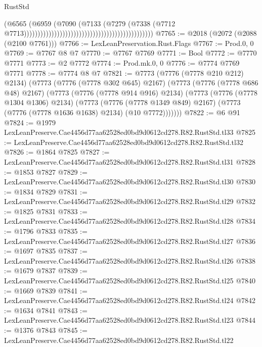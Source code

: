 \begin{lexlean}{RustStd}
\begin{coremodule}
                                                                                    (@6565
                                                                                      (@6959
                                                                                        (@7090
                                                                                          (@7133
                                                                                            (@7279
                                                                                              (@7338
                                                                                                (@7712
                                                                                                  @7713)))))))))))))))))))))))))))))))))))))))))))))))
@7765 := @2018 (@2072 (@2088 (@2100 @7761)))
@7766 := LexLeanPreservation.Rust.Flags
@7767 := Prod.{0, 0}
@7769 := @7767 @8 @7
@7770 := @7767 @7769
@7771 := Bool
@7772 := @7770 @7771
@7773 := @2 @7772
@7774 := Prod.mk.{0, 0}
@7776 := @7774 @7769 @7771
@7778 := @7774 @8 @7
@7821 := @7773
    (@7776 (@7778 @210 @212) @2134)
    (@7773
      (@7776 (@7778 @302 @645) @2167)
      (@7773
        (@7776 (@7778 @686 @48) @2167)
        (@7773
          (@7776 (@7778 @914 @916) @2134)
          (@7773
            (@7776 (@7778 @1304 @1306) @2134)
            (@7773
              (@7776 (@7778 @1349 @849) @2167)
              (@7773 (@7776 (@7778 @1636 @1638) @2134) (@10 @7772)))))))
@7822 := @6 @91
@7824 := @1979 LexLeanPreserve.Cae4456d77aa62528ed0bd9d0612cd278.R82.RustStd.tl33
@7825 := LexLeanPreserve.Cae4456d77aa62528ed0bd9d0612cd278.R82.RustStd.tl32
@7826 := @1864 @7825
@7827 := LexLeanPreserve.Cae4456d77aa62528ed0bd9d0612cd278.R82.RustStd.tl31
@7828 := @1853 @7827
@7829 := LexLeanPreserve.Cae4456d77aa62528ed0bd9d0612cd278.R82.RustStd.tl30
@7830 := @1834 @7829
@7831 := LexLeanPreserve.Cae4456d77aa62528ed0bd9d0612cd278.R82.RustStd.tl29
@7832 := @1825 @7831
@7833 := LexLeanPreserve.Cae4456d77aa62528ed0bd9d0612cd278.R82.RustStd.tl28
@7834 := @1796 @7833
@7835 := LexLeanPreserve.Cae4456d77aa62528ed0bd9d0612cd278.R82.RustStd.tl27
@7836 := @1697 @7835
@7837 := LexLeanPreserve.Cae4456d77aa62528ed0bd9d0612cd278.R82.RustStd.tl26
@7838 := @1679 @7837
@7839 := LexLeanPreserve.Cae4456d77aa62528ed0bd9d0612cd278.R82.RustStd.tl25
@7840 := @1669 @7839
@7841 := LexLeanPreserve.Cae4456d77aa62528ed0bd9d0612cd278.R82.RustStd.tl24
@7842 := @1634 @7841
@7843 := LexLeanPreserve.Cae4456d77aa62528ed0bd9d0612cd278.R82.RustStd.tl23
@7844 := @1376 @7843
@7845 := LexLeanPreserve.Cae4456d77aa62528ed0bd9d0612cd278.R82.RustStd.tl22

\end{coremodule}
\end{lexlean}

